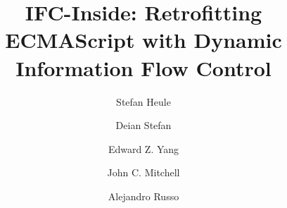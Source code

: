 \documentclass[9pt]{llncs}
\newif\ifextended
\begin{document}


\title{
IFC-Inside: Retrofitting ECMAScript with Dynamic Information Flow Control
}
\ifextended
\subtitle{Extended Version}
\fi

\author{
  Stefan Heule \and
  Deian Stefan \and
  Edward Z. Yang \and
  John C. Mitchell \and
  Alejandro Russo
}

\maketitle




\balance
{\frenchspacing\scriptsize
  \setlength{\bibsep}{2pt}
  
  
}

\ifextended
\balance
\fi
\end{document}
